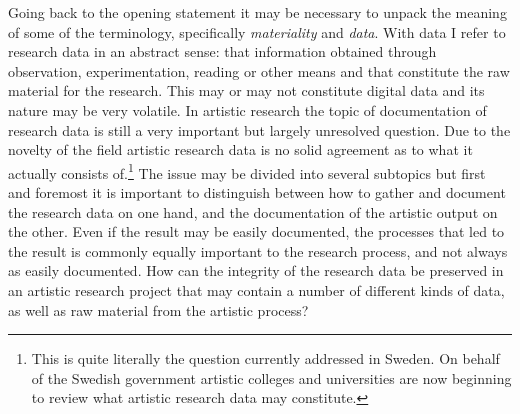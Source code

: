 \documentclass[11pt,a4paper]{article}
\begin{document}
Going back to the opening statement it may be necessary to unpack the meaning of some of the terminology, specifically \emph{materiality} and \emph{data}. With data I refer to research data in an abstract sense: that information obtained through observation, experimentation, reading or other means and that constitute the raw material for the research. This may or may not constitute digital data and its nature may be very volatile. In artistic research the topic of documentation of research data is still a very important but largely unresolved question. Due to the novelty of the field artistic research data is no solid agreement as to what it actually consists of.\footnote{This is quite literally the question currently addressed in Sweden. On behalf of the Swedish government artistic colleges and universities are now beginning to review what artistic research data may constitute.} The issue may be divided into several subtopics but first and foremost it is important to distinguish between how to gather and document the research data on one hand, and the documentation of the artistic output on the other. Even if the result may be easily documented, the processes that led to the result is commonly equally important to the research process, and not always as easily documented. How can the integrity of the research data be preserved in an artistic research project that may contain a number of different kinds of data, as well as raw material from the artistic process? 
\end{document}
